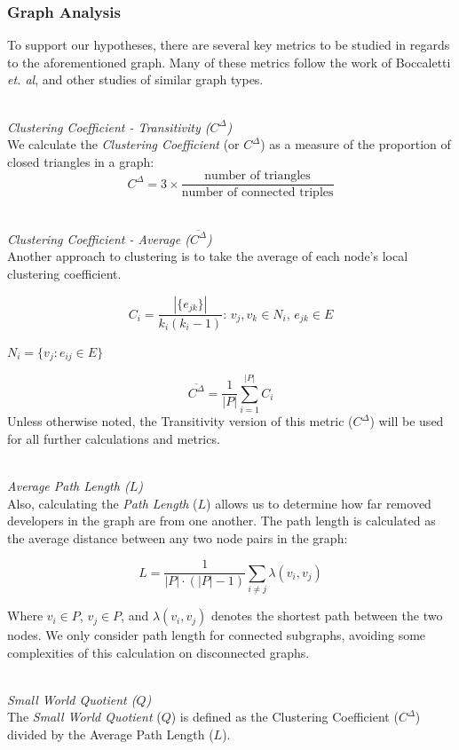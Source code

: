 \documentclass{proc}
\begin{document}
\subsubsection{Graph Analysis}
To support our hypotheses, there are several key metrics to be studied in regards to the aforementioned graph. Many of these metrics follow the work of Boccaletti \textit{et. al}\cite{boccaletti2006complex}, and other studies of similar graph types\cite{latora2001efficient,adamic1999small}.

\noindent\\\textit{Clustering Coefficient - Transitivity ($C^\Delta$)}\\
We calculate the \textit{Clustering Coefficient} (or $C^\Delta$) as a measure of the proportion of closed triangles in a graph\cite{newman2003structure}:
\[C^\Delta = 3 \times \frac{\text{number of triangles}}
                    {\text{number of connected triples}}\]

\noindent\\\textit{Clustering Coefficient - Average ($\overline{C^\Delta}$)}\\
Another approach to clustering is to take the average of each node's local clustering coefficient\cite{watts1998collective}.

\[ C_i = \frac{|\{e_{jk}\}|}{k_i(k_i-1)} :\, v_j,v_k \in N_i,\, e_{jk} \in E \]

{$N_i = \{v_j : e_{ij} \in E\}$}

\[ \overline{C^\Delta} = \frac{1}{|P|}\sum^{|P|}_{i=1}C_i \]
Unless otherwise noted, the Transitivity version of this metric ($C^\Delta$) will be used for all further calculations and metrics.

\noindent\\\textit{Average Path Length ($L$)}\\
Also, calculating the \textit{Path Length} ($L$) allows us to determine how far removed developers in the graph are from one another. The path length is calculated as the average distance between any two node pairs in the graph:

\[L = \frac{1}{|P| \cdot (|P|-1)} \sum_{i \neq j}\lambda(v_i,v_j)\]

Where {$v_i \in P$}, {$v_j \in P$}, and {$\lambda(v_i,v_j)$} denotes the shortest path between the two nodes. We only consider path length for connected subgraphs, avoiding some complexities of this calculation on disconnected graphs\cite{boccaletti2006complex}.

\noindent\\\textit{Small World Quotient ($Q$)}\\
The \textit{Small World Quotient} ($Q$) is defined as the Clustering Coefficient ($C^\Delta$) divided by the  Average Path Length ($L$)\cite{watts1999small,watts1998collective}.
\end{document}
